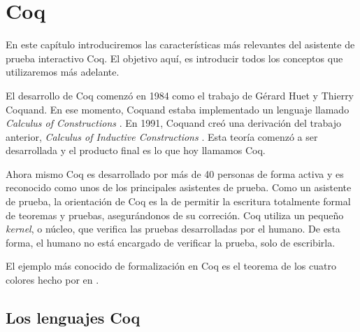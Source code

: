 \chapter{Coq}\label{ch:coq}

En este capítulo introduciremos las características más relevantes del asistente de prueba interactivo Coq. El objetivo aquí, es introducir todos los conceptos que utilizaremos más adelante.

El desarrollo de Coq comenzó en 1984 como el trabajo de Gérard Huet y Thierry Coquand. En ese momento, Coquand estaba implementado un lenguaje llamado \emph{Calculus of Constructions} \cite{DBLP:journals/iandc/CoquandH88}.
En 1991, Coquand creó una derivación del trabajo anterior, \emph{Calculus of Inductive Constructions} \cite{CIC}. Esta teoría comenzó a ser desarrollada y el producto final es lo que hoy llamamos Coq.

Ahora mismo Coq es desarrollado por más de 40 personas de forma activa y es reconocido como unos de los principales asistentes de prueba.
Como un asistente de prueba, la orientación de Coq es la de permitir la escritura totalmente formal de teoremas y pruebas, asegurándonos de su correción.
Coq utiliza un pequeño \textit{kernel}, o núcleo, que verifica las pruebas desarrolladas por el humano.
De esta forma, el humano no está encargado de verificar la prueba, solo de escribirla.

El ejemplo más conocido de formalización en Coq es el teorema de los cuatro colores \cite{DBLP:conf/ascm/Gonthier07} hecho por \citeauthor{DBLP:conf/ascm/Gonthier07} en \citeyear{DBLP:conf/ascm/Gonthier07}.

\section{Los lenguajes Coq}

